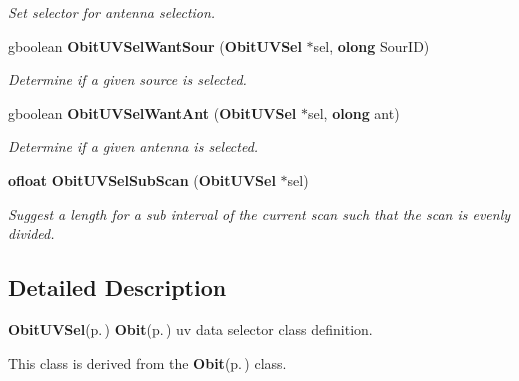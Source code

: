 \begin{CompactItemize}
\begin{CompactList}\small\item\em Set selector for antenna selection. \item\end{CompactList}\item 
gboolean {\bf Obit\-UVSel\-Want\-Sour} ({\bf Obit\-UVSel} $\ast$sel, {\bf olong} Sour\-ID)
\begin{CompactList}\small\item\em Determine if a given source is selected. \item\end{CompactList}\item 
gboolean {\bf Obit\-UVSel\-Want\-Ant} ({\bf Obit\-UVSel} $\ast$sel, {\bf olong} ant)
\begin{CompactList}\small\item\em Determine if a given antenna is selected. \item\end{CompactList}\item 
{\bf ofloat} {\bf Obit\-UVSel\-Sub\-Scan} ({\bf Obit\-UVSel} $\ast$sel)
\begin{CompactList}\small\item\em Suggest a length for a sub interval of the current scan such that the scan is evenly divided. \item\end{CompactList}\end{CompactItemize}


\subsection{Detailed Description}
{\bf Obit\-UVSel}{\rm (p.\,\pageref{structObitUVSel})} {\bf Obit}{\rm (p.\,\pageref{structObit})} uv data selector class definition. 

This class is derived from the {\bf Obit}{\rm (p.\,\pageref{structObit})} class.

